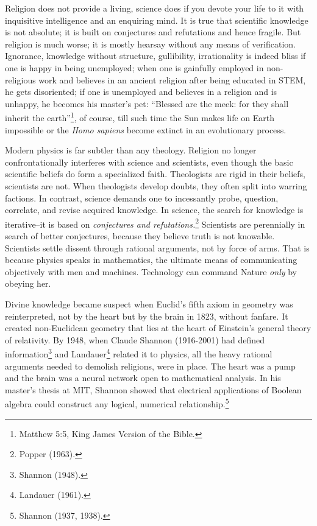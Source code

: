 \begin{multicols}{2}
Religion does not provide a living, science does if you devote your life to it with inquisitive intelligence and an enquiring mind. It is true that scientific knowledge is not absolute; it is built on conjectures and refutations and hence fragile. But religion is much worse; it is mostly hearsay without any means of verification. Ignorance, knowledge without structure, gullibility, irrationality is indeed bliss if one is happy in being unemployed; when one is gainfully employed in non-religious work and believes in an ancient religion after being educated in STEM, he gets disoriented; if one is unemployed and believes in a religion and is unhappy, he becomes his master's pet: “Blessed are the meek: for they shall inherit the earth”\footnote{Matthew 5:5, King James Version of the Bible.}, of course, till such time the Sun makes life on Earth impossible or the \textit{Homo sapiens} become extinct in an evolutionary process.

Modern physics is far subtler than any theology. Religion no longer confrontationally interferes with science and scientists, even though the basic scientific beliefs do form a specialized faith. Theologists are rigid in their beliefs, scientists are not. When theologists develop doubts, they often split into warring factions. In contrast, science demands one to incessantly probe, question, correlate, and revise acquired knowledge. In science, the search for knowledge is iterative--it is based on \textit{conjectures and refutations.}\footnote{Popper (1963).} Scientists are perennially in search of better conjectures, because they believe truth is not knowable. Scientists settle dissent through rational arguments, not by force of arms. That is because physics speaks in mathematics, the ultimate means of communicating objectively with men and machines. Technology can command Nature \textit{only} by obeying her.

Divine knowledge became suspect when Euclid's fifth axiom in geometry was reinterpreted, not by the heart but by the brain in 1823, without fanfare. It created non-Euclidean geometry that lies at the heart of Einstein's general theory of relativity. By 1948, when Claude Shannon (1916-2001) had defined information\footnote{Shannon (1948).}  and Landauer\footnote{Landauer (1961).}  related it to physics, all the heavy rational arguments needed to demolish religions, were in place. The heart was a pump and the brain was a neural network open to mathematical analysis. In his master's thesis at MIT, Shannon showed that electrical applications of Boolean algebra could construct any logical, numerical relationship.\footnote{Shannon (1937, 1938).}


\end{multicols}
